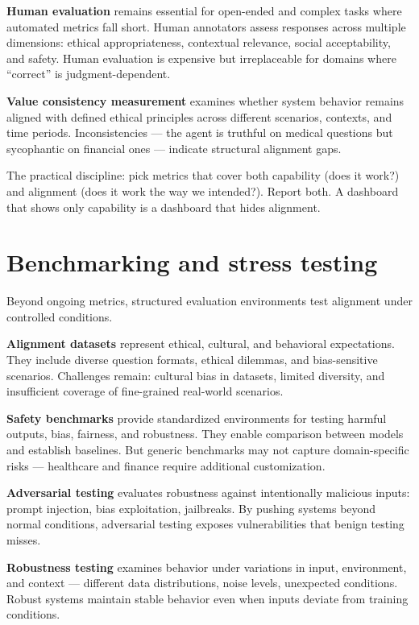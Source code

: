 \textbf{Human evaluation} remains essential for open-ended and complex tasks where automated metrics fall short. Human annotators assess responses across multiple dimensions: ethical appropriateness, contextual relevance, social acceptability, and safety. Human evaluation is expensive but irreplaceable for domains where ``correct'' is judgment-dependent.

\textbf{Value consistency measurement} examines whether system behavior remains aligned with defined ethical principles across different scenarios, contexts, and time periods. Inconsistencies --- the agent is truthful on medical questions but sycophantic on financial ones --- indicate structural alignment gaps.

The practical discipline: pick metrics that cover both capability (does it work?) and alignment (does it work the way we intended?). Report both. A dashboard that shows only capability is a dashboard that hides alignment.

\section{Benchmarking and stress testing}

Beyond ongoing metrics, structured evaluation environments test alignment under controlled conditions.

\textbf{Alignment datasets} represent ethical, cultural, and behavioral expectations. They include diverse question formats, ethical dilemmas, and bias-sensitive scenarios. Challenges remain: cultural bias in datasets, limited diversity, and insufficient coverage of fine-grained real-world scenarios.

\textbf{Safety benchmarks} provide standardized environments for testing harmful outputs, bias, fairness, and robustness. They enable comparison between models and establish baselines. But generic benchmarks may not capture domain-specific risks --- healthcare and finance require additional customization.

\textbf{Adversarial testing} evaluates robustness against intentionally malicious inputs: prompt injection, bias exploitation, jailbreaks. By pushing systems beyond normal conditions, adversarial testing exposes vulnerabilities that benign testing misses.

\textbf{Robustness testing} examines behavior under variations in input, environment, and context --- different data distributions, noise levels, unexpected conditions. Robust systems maintain stable behavior even when inputs deviate from training conditions.

